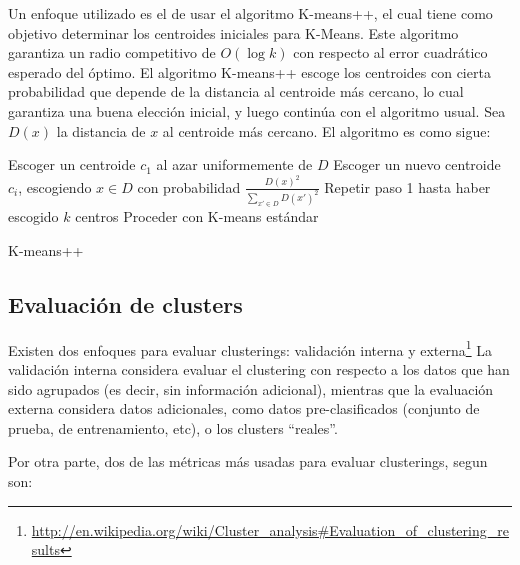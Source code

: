 \documentclass[upright, contnum]{umemoria}
\begin{document}
    Un enfoque utilizado es el de usar el algoritmo
    K-means++\cite{Arthur:2007:KAC:1283383.1283494}, el cual tiene
    como objetivo determinar los centroides iniciales para
    K-Means. Este algoritmo garantiza un radio competitivo de 
    $O(\log k)$ con respecto al error cuadrático esperado del óptimo.
    El algoritmo K-means++ escoge los centroides con cierta
    probabilidad que depende de la distancia al centroide más cercano,
    lo cual garantiza una buena elección inicial, y luego continúa con
    el algoritmo usual. Sea $D(x)$ la distancia de $x$ al centroide
    más cercano. El algoritmo es como sigue:

\begin{algorithm}[H]
Escoger un centroide $c_1$ al azar uniformemente de $D$\;
Escoger un nuevo centroide $c_i$, escogiendo $x \in D$ con probabilidad $\frac{D(x)^2}{\sum_{x' \in D}D(x')^2}$\;
Repetir paso 1 hasta haber escogido $k$ centros\;
Proceder con K-means estándar\;
 \caption{K-means++}
\end{algorithm}
    

\subsection{Evaluación de clusters}
\label{sec-2.2.4}


    Existen dos enfoques para evaluar clusterings: validación interna
    y externa\footnote{\href{http://en.wikipedia.org/wiki/Cluster\_analysis\#Evaluation\_of\_clustering\_results}{http://en.wikipedia.org/wiki/Cluster\_analysis\#Evaluation\_of\_clustering\_results} } La validación interna considera evaluar el clustering
    con respecto a los datos que han sido agrupados (es decir, sin
    información adicional), mientras que la evaluación externa
    considera datos adicionales, como datos pre-clasificados (conjunto
    de prueba, de entrenamiento, etc), o los clusters ``reales''.

    Por otra parte, dos de las métricas más usadas para evaluar
    clusterings, segun \cite{Zhao02criterionfunctions} son:
\end{document}
